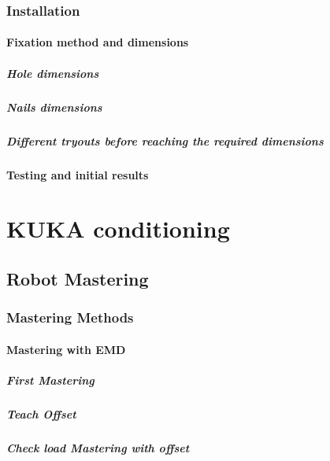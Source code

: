 \documentclass{book}
\begin{document}
			\subsection{Installation}
				\subsubsection{Fixation method and dimensions}
				\paragraph{Hole dimensions}
				\paragraph{Nails dimensions}
				\paragraph{Different tryouts before reaching the required dimensions}
				
				\subsubsection{Testing and initial results}
			
	
	
	\chapter{KUKA conditioning}
		\section{Robot Mastering}
			\subsection{Mastering Methods}
			\subsubsection{Mastering with EMD}
				\paragraph{First Mastering}
				\paragraph{Teach Offset}
				\paragraph{Check load Mastering with offset}
\end{document}
